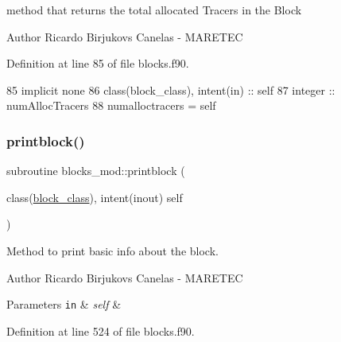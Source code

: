 method that returns the total allocated Tracers in the Block 

\begin{DoxyAuthor}{Author}
Ricardo Birjukovs Canelas -\/ M\+A\+R\+E\+T\+EC 
\end{DoxyAuthor}


Definition at line 85 of file blocks.\+f90.


\begin{DoxyCode}
85     \textcolor{keywordtype}{implicit none}
86     \textcolor{keywordtype}{class}(block\_class), \textcolor{keywordtype}{intent(in)} :: self
87     \textcolor{keywordtype}{integer} :: numAllocTracers
88     numalloctracers = self%
\end{DoxyCode}
\mbox{\label{namespaceblocks__mod_a6eab8b323cb15dcecb5c6b0c31b4e246}} 
\subsubsection{\texorpdfstring{printblock()}{printblock()}}
{\footnotesize\ttfamily subroutine blocks\+\_\+mod\+::printblock (\begin{DoxyParamCaption}\item[{class(\mbox{\hyperlink{structblocks__mod_1_1block__class}{block\+\_\+class}}), intent(inout)}]{self }\end{DoxyParamCaption})\hspace{0.3cm}{\ttfamily [private]}}



Method to print basic info about the block. 

\begin{DoxyAuthor}{Author}
Ricardo Birjukovs Canelas -\/ M\+A\+R\+E\+T\+EC 
\end{DoxyAuthor}

\begin{DoxyParams}[1]{Parameters}
\mbox{\tt in}  & {\em self} & \\
\hline
\end{DoxyParams}


Definition at line 524 of file blocks.\+f90.


